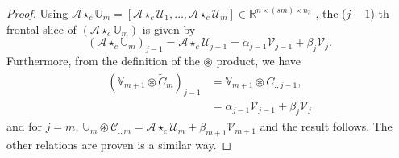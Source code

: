 \documentclass{siamltex}
\newcommand{\1}{\mathbb{1}}
\newcommand{\0}{\mathbb{0}}
\begin{document}
	\begin{proof}
		Using $\mathscr{A}\star_c\mathbb{U}_{m}=[\mathscr{A}\star_c\mathscr{U}_{1},\ldots,\mathscr{A}\star_c\mathscr{U}_{m}] \in  \mathbb{R}^{n \times (sm)\times n_{3}} $ , the ($j-1$)-th frontal slice    of $(\mathscr{A}\star_c\mathbb{U}_{m})$ is given by   $$ (\mathcal {A} \star_c \mathbb{U}_m)_{j-1} =\mathscr {A} \star_c \mathscr {U}_{j-1}= {\alpha }_{j-1} \mathscr {V}_{j-1}+{\beta }_j \mathcal {V}_{j}.$$
		Furthermore, from the definition of the $\circledast$ product, we have
		\begin{align*}
		(\mathbb{V}_{m+1}   \circledast \widetilde{ { C}}_{m})_{j-1}&=\mathbb{V}_{m+1}\circledast C_{.,j-1},\\
		&={\alpha }_{j-1} \mathscr {V}_{j-1}+{\beta }_j \mathcal {V}_{j}
		\end{align*}
		and for $j=m$,  $\mathbb{U}_{m} \circledast \mathscr{C}_{.,m}= \mathscr{A}\star_c \mathscr{U}_{m}+{\beta}_{m+1} \mathscr{V}_{m+1} $ and the result follows. 
		The other relations are proven is a similar way.
	\end{proof}
	
	
	
\end{document}
